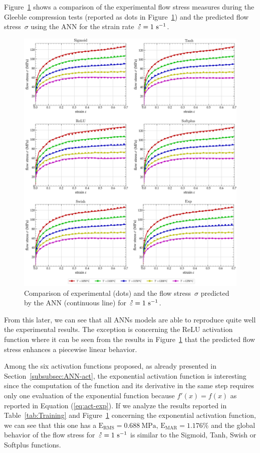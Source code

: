 \documentclass[algorithms,article,submit,pdftex,oneauthors]{Definitions/mdpi}
\DeclareRobustCommand{\mdot}[1]{\accentset{\mbox{\bfseries .}}{#1}}
\DeclareRobustCommand{\RMSE}{\text{E}_\text{RMS}}
\DeclareRobustCommand{\MARE}{\text{E}_\text{MAR}}
\DeclareRobustCommand{\ps}{\text{s}^{-1}}
\DeclareRobustCommand{\MPa}{\text{MPa}}
\begin{document}
Figure~\ref{fig:ANNFit} shows a comparison of the experimental flow stress measures during the Gleeble compression tests (reported as dots in Figure~\ref{fig:ANNFit}) and the predicted flow stress~$\sigma$ using the ANN for the strain rate~$\mdot{\varepsilon}=1~\ps$.
\begin{figure}[h!]
\centering
\includegraphics[width=0.95\columnwidth]{Figures/ANN-fit}
\caption{Comparison of experimental (dots) and the flow stress~$\sigma$ predicted by the ANN (continuous line) for~$\mdot{\varepsilon}=1~\ps$.}
\label{fig:ANNFit}
\end{figure}
From this later, we can see that all ANNs models are able to reproduce quite well the experimental results.
The exception is concerning the ReLU activation function where it can be seen from the results in Figure~\ref{fig:ANNFit} that the predicted flow stress enhances a piecewise linear behavior.

Among the six activation functions proposed, as already presented in Section~\ref{subsubsec:ANN-act}, the exponential activation function is interesting since the computation of the function and its derivative in the same step requires only one evaluation of the exponential function because $f'(x)=f(x)$ as reported in Equation (\ref{eq:act-exp}).
If we analyze the results reported in Table~\ref{tab:Training} and Figure~\ref{fig:ANNFit} concerning the exponential activation function, we can see that this one has a $\RMSE=0.688~\MPa$, $\MARE=1.176\%$ and the global behavior of the flow stress for~$\mdot{\varepsilon}=1~\ps$ is similar to the Sigmoid, Tanh, Swish or Softplus functions.
\end{document}
